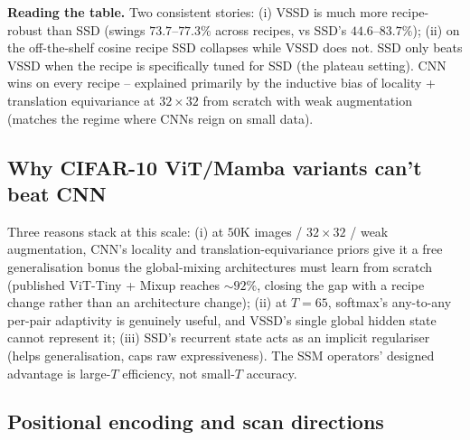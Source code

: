 \documentclass[11pt,a4paper]{article}
\begin{document}
\textbf{Reading the table.} Two consistent stories: (i) VSSD is much
more recipe-robust than SSD (swings $73.7$--$77.3\%$ across recipes,
vs SSD's $44.6$--$83.7\%$); (ii) on the off-the-shelf cosine recipe
SSD collapses while VSSD does not. SSD only beats VSSD when the
recipe is specifically tuned for SSD (the plateau setting). CNN wins
on every recipe -- explained primarily by the inductive bias of
locality + translation equivariance at $32\times 32$ from scratch
with weak augmentation (matches the regime where CNNs reign on small
data).

\subsection{Why CIFAR-10 ViT/Mamba variants can't beat CNN}
\label{sec:cifar-cnn}

Three reasons stack at this scale: (i) at $50$K images / $32\times 32$
/ weak augmentation, CNN's locality and translation-equivariance
priors give it a free generalisation bonus the global-mixing
architectures must learn from scratch (published ViT-Tiny + Mixup
reaches $\sim 92\%$, closing the gap with a recipe change rather than
an architecture change); (ii) at $T=65$, softmax's any-to-any
per-pair adaptivity is genuinely useful, and VSSD's single global
hidden state cannot represent it; (iii) SSD's recurrent state acts as
an implicit regulariser (helps generalisation, caps raw expressiveness).
The SSM operators' designed advantage is large-$T$ efficiency, not
small-$T$ accuracy.

\subsection{Positional encoding and scan directions}
\label{sec:ablation}
\end{document}
